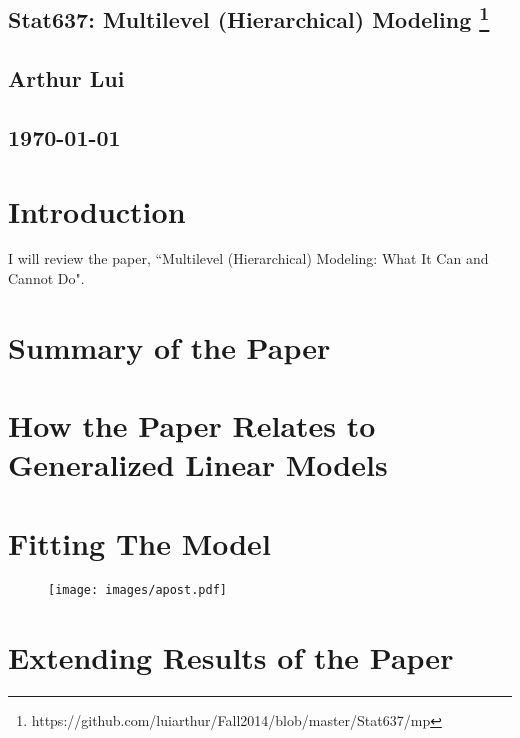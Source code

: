 \documentclass{article}
\def\beginmyfig{\begin{figure}[htbp]\begin{center}}
\def\endmyfig{\end{center}\end{figure}}
\begin{document}
\begin{center}
  \section*{\textbf{Stat637: Multilevel (Hierarchical) Modeling}
    \footnote{https://github.com/luiarthur/Fall2014/blob/master/Stat637/mp}
  }  
  \subsection*{\textbf{Arthur Lui}}
  \subsection*{\noindent\today}
\end{center}

\section{Introduction}
I will review the paper, ``Multilevel (Hierarchical) Modeling: What It Can and Cannot Do".

\section{Summary of the Paper}

\section{How the Paper Relates to Generalized Linear Models}

\section{Fitting The Model}
\beginmyfig
  \texttt{[image: images/apost.pdf]}
\endmyfig

\section{Extending Results of the Paper}
\end{document}
